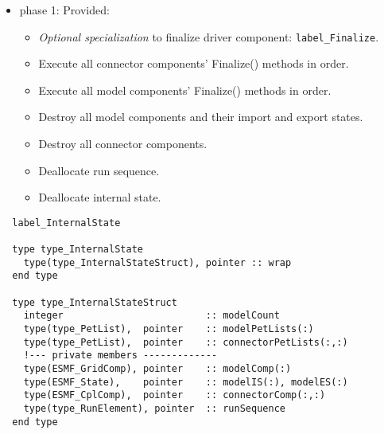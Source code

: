 \begin{itemize}
\item phase 1: {\sc Provided:}
  \begin{itemize}
  \item {\it Optional specialization} to finalize driver component: {\tt label\_Finalize}.
  \item Execute all connector components' Finalize() methods in order.
  \item Execute all model components' Finalize() methods in order.
  \item Destroy all model components and their import and export states.
  \item Destroy all connector components.
  \item Deallocate run sequence.
  \item Deallocate internal state.
  \end{itemize}      
\end{itemize}

\begin{verbatim}  label_InternalState

  type type_InternalState
    type(type_InternalStateStruct), pointer :: wrap
  end type

  type type_InternalStateStruct
    integer                         :: modelCount
    type(type_PetList),  pointer    :: modelPetLists(:)
    type(type_PetList),  pointer    :: connectorPetLists(:,:)
    !--- private members -------------
    type(ESMF_GridComp), pointer    :: modelComp(:)
    type(ESMF_State),    pointer    :: modelIS(:), modelES(:)
    type(ESMF_CplComp),  pointer    :: connectorComp(:,:)
    type(type_RunElement), pointer  :: runSequence
  end type

\end{verbatim}


